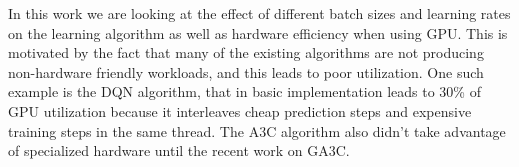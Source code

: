 In this work we are looking at the effect of different batch sizes and learning rates on the
learning algorithm as well as hardware efficiency when using GPU. This is motivated by the fact
that many of the existing algorithms are not producing non-hardware friendly workloads, and this
leads to poor utilization. One such example is the DQN algorithm, that in basic implementation
leads to 30\% of GPU utilization because it interleaves cheap prediction steps and expensive
training steps in the same thread. The A3C algorithm also didn't take advantage of specialized
hardware until the recent work on GA3C.

